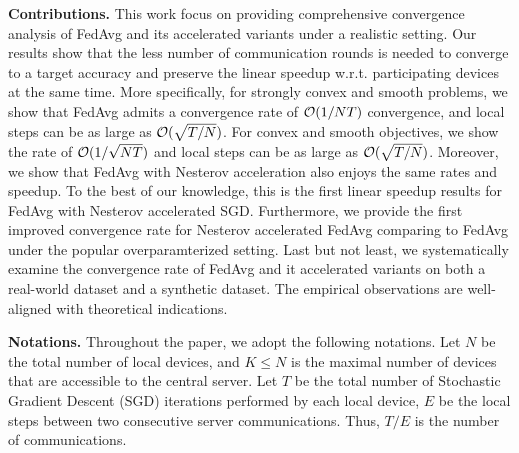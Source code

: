 \textbf{Contributions.}
This work focus on providing comprehensive convergence analysis
of FedAvg and its accelerated variants under a realistic setting.
Our results show
that the less number of communication rounds is needed to converge to a
target accuracy and preserve the linear speedup w.r.t. participating devices at the same time.
More specifically, for strongly convex and smooth problems, we show 
that FedAvg admits a convergence rate of 
{\small{${\mathcal{O}}(1/NT)$}} convergence, and local steps can be as large as {\small{${\mathcal{O}}(\sqrt{T/N})$}}. For convex and smooth objectives, we show the rate of {\small{${\mathcal{O}}(1/\sqrt{NT})$}} and local steps can be as large as {\small{${\mathcal{O}}(\sqrt{T/N})$}}. 
Moreover, we show that FedAvg with Nesterov acceleration also enjoys the same rates and speedup. 
To the best of our knowledge, this is the first linear speedup results for FedAvg with Nesterov accelerated SGD. Furthermore, 
we provide the first improved convergence rate for Nesterov accelerated FedAvg comparing to FedAvg under the popular overparamterized setting. 
Last but not least, we systematically examine the convergence rate of
FedAvg and it accelerated variants on both a real-world dataset and a synthetic dataset. The empirical observations are well-aligned with theoretical indications.



\textbf{Notations.}
Throughout the paper, we adopt the following notations. Let $N$ be the total
number of local devices, and $K \leq N$ is the maximal number of devices
that are accessible to the central server.  Let $T$ be the total number of  Stochastic Gradient Descent (SGD) iterations performed by each local device, $E$ be the local steps between two consecutive server communications. Thus, $T/E$ is
the number of communications.

